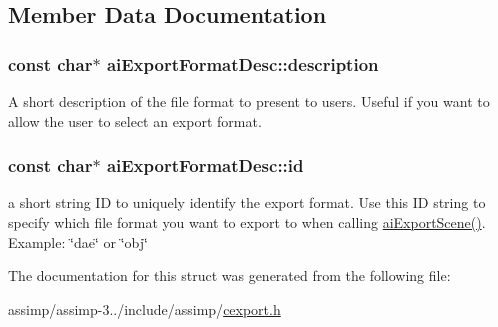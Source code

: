 \subsection{Member Data Documentation}
\hypertarget{structai_export_format_desc_a9c84c4b07c5177fb6539b9bdf90236fb}{
\subsubsection[{description}]{\setlength{\rightskip}{0pt plus 5cm}const char$\ast$ ai\+Export\+Format\+Desc\+::description}}\label{structai_export_format_desc_a9c84c4b07c5177fb6539b9bdf90236fb}
A short description of the file format to present to users. Useful if you want to allow the user to select an export format. \hypertarget{structai_export_format_desc_afe216eaea3a04abca041e5c253f94bbf}{
\subsubsection[{id}]{\setlength{\rightskip}{0pt plus 5cm}const char$\ast$ ai\+Export\+Format\+Desc\+::id}}\label{structai_export_format_desc_afe216eaea3a04abca041e5c253f94bbf}
a short string I\+D to uniquely identify the export format. Use this I\+D string to specify which file format you want to export to when calling \hyperlink{cexport_8h_a9615510b8430a9da4f435a72148128dd}{ai\+Export\+Scene()}. Example\+: \char`\"{}dae\char`\"{} or \char`\"{}obj\char`\"{} 

The documentation for this struct was generated from the following file\+:\begin{DoxyCompactItemize}
\item 
assimp/assimp-\/3../include/assimp/\hyperlink{cexport_8h}{cexport.\+h}\end{DoxyCompactItemize}
